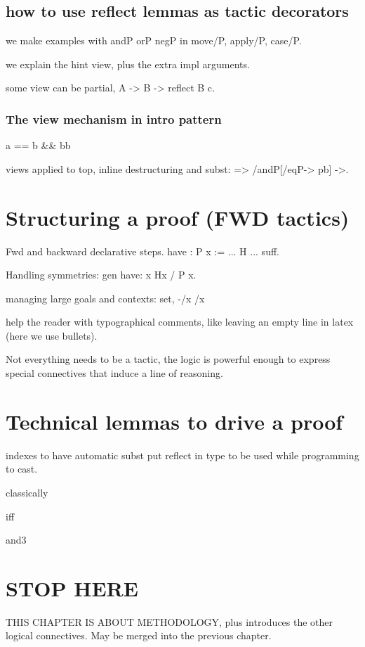 \subsection{how to use reflect lemmas as tactic decorators}

we make examples with andP orP negP in move/P, apply/P, case/P.

we explain the hint view, plus the extra impl arguments.

some view can be partial, A -> B -> reflect B c.

\subsubsection{The view mechanism in intro pattern}

  a == b \&\& bb

views applied to top, inline destructuring and subst:
  => /andP[/eqP-> pb] ->.

\section{Structuring a proof (FWD tactics)}

Fwd and backward declarative steps.
have : P x := ... H ...
suff.

Handling symmetries:
gen have: x Hx / P x.

managing large goals and contexts: set, -/x /x 

help the reader with typographical comments, like leaving an empty
line in latex (here we use bullets).

Not everything needs to be a tactic, the logic is powerful
enough to express special connectives that induce a line of
reasoning.

\section{Technical lemmas to drive a proof}

indexes to have automatic subst
put reflect in type to be used while programming to cast.

classically

iff

and3

\section{STOP HERE}

THIS CHAPTER IS ABOUT METHODOLOGY, plus introduces the other logical
connectives. May be merged into the previous chapter.


